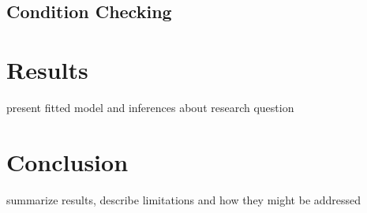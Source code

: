 \documentclass[12pt]{article}
\begin{document}
\subsection{Condition Checking}











\section{Results}
present fitted model and inferences about research question








\section{Conclusion}
summarize results, describe limitations and how they might be addressed



\theendnotes
\end{document}
